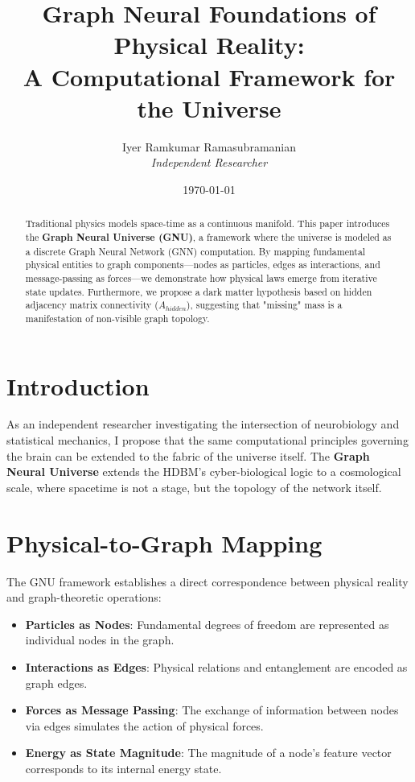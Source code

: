 \documentclass[12pt]{article}
\title{\textbf{Graph Neural Foundations of Physical Reality: \\ A Computational Framework for the Universe}}
\author{Iyer Ramkumar Ramasubramanian \\ \textit{Independent Researcher}}
\date{\today}
\begin{document}
\maketitle

\begin{abstract}
Traditional physics models space-time as a continuous manifold. This paper introduces the \textbf{Graph Neural Universe (GNU)}, a framework where the universe is modeled as a discrete Graph Neural Network (GNN) computation. By mapping fundamental physical entities to graph components—nodes as particles, edges as interactions, and message-passing as forces—we demonstrate how physical laws emerge from iterative state updates. Furthermore, we propose a dark matter hypothesis based on hidden adjacency matrix connectivity ($A_{hidden}$), suggesting that "missing" mass is a manifestation of non-visible graph topology.
\end{abstract}

\section{Introduction}
As an independent researcher investigating the intersection of neurobiology and statistical mechanics, I propose that the same computational principles governing the brain can be extended to the fabric of the universe itself. The \textbf{Graph Neural Universe} extends the HDBM's cyber-biological logic to a cosmological scale, where spacetime is not a stage, but the topology of the network itself.

\section{Physical-to-Graph Mapping}

The GNU framework establishes a direct correspondence between physical reality and graph-theoretic operations:

\begin{itemize}
\item \textbf{Particles as Nodes}: Fundamental degrees of freedom are represented as individual nodes in the graph.
\item \textbf{Interactions as Edges}: Physical relations and entanglement are encoded as graph edges.
\item \textbf{Forces as Message Passing}: The exchange of information between nodes via edges simulates the action of physical forces.
\item \textbf{Energy as State Magnitude}: The magnitude of a node's feature vector corresponds to its internal energy state.
\end{itemize}
\end{document}
